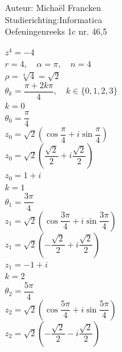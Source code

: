 \documentclass[a4paper]{article}
\begin{document}
\noindent \large Auteur: Michaël Francken\\
\noindent \large Studierichting:Informatica\\
\noindent \large Oefeningenreeks 1c nr. 46,5\\

\normalsize


$z^4 = -4$ \\

$r = 4, \quad \alpha = \pi, \quad n = 4$ \\

$\rho = \sqrt[4]{4} = \sqrt{2}$ \\

$\theta_k = \dfrac{\pi+2k\pi}{4}, \quad k \in \{0, 1, 2, 3\}$\\



$k = 0$ \\

$\theta_0 = \dfrac{\pi}{4}$ \\

$z_0 = \sqrt{2} \left(\cos \dfrac{\pi}{4} + i \sin \dfrac{\pi}{4}\right)$ \\

$z_0 = \sqrt{2} \left(\dfrac{\sqrt{2}}{2} + i \dfrac{\sqrt{2}}{2}\right)$ \\

$z_0 = 1 + i$\\



$k = 1$ \\

$\theta_1 = \dfrac{3\pi}{4}$ \\

$z_1 = \sqrt{2} \left(\cos \dfrac{3\pi}{4} + i \sin \dfrac{3\pi}{4}\right)$ \\

$z_1 = \sqrt{2} \left(-\dfrac{\sqrt{2}}{2} + i \dfrac{\sqrt{2}}{2}\right)$ \\

$z_1 = -1 + i$\\



$k = 2$ \\

$\theta_2 = \dfrac{5\pi}{4}$ \\

$z_2 = \sqrt{2} \left(\cos \dfrac{5\pi}{4} + i \sin \dfrac{5\pi}{4}\right)$ \\

$z_2 = \sqrt{2} \left(-\dfrac{\sqrt{2}}{2} - i \dfrac{\sqrt{2}}{2}\right)$ \\
\end{document}

